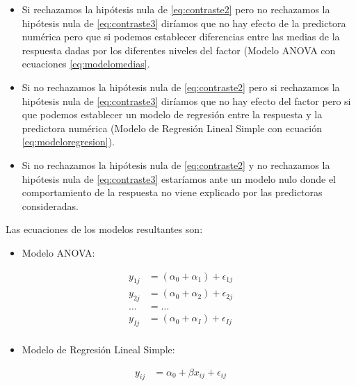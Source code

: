 \documentclass[
]{book}
\providecommand{\tightlist}{%
  \setlength{\itemsep}{0pt}\setlength{\parskip}{0pt}}
\theoremstyle{definition}
\theoremstyle{definition}
\theoremstyle{definition}
\theoremstyle{remark}
\begin{document}
\begin{itemize}
\tightlist
\item
  Si rechazamos la hipótesis nula de \eqref{eq:contraste2} pero no rechazamos la hipótesis nula de \eqref{eq:contraste3} diríamos que no hay efecto de la predictora numérica pero que si podemos establecer diferencias entre las medias de la respuesta dadas por los diferentes niveles del factor (Modelo ANOVA con ecuaciones \eqref{eq:modelomedias}.
\item
  Si no rechazamos la hipótesis nula de \eqref{eq:contraste2} pero si rechazamos la hipótesis nula de \eqref{eq:contraste3} diríamos que no hay efecto del factor pero si que podemos establecer un modelo de regresión entre la respuesta y la predictora numérica (Modelo de Regresión Lineal Simple con ecuación \eqref{eq:modeloregresion}).
\item
  Si no rechazamos la hipótesis nula de \eqref{eq:contraste2} y no rechazamos la hipótesis nula de \eqref{eq:contraste3} estaríamos ante un modelo nulo donde el comportamiento de la respuesta no viene explicado por las predictoras consideradas.
\end{itemize}

Las ecuaciones de los modelos resultantes son:

\begin{itemize}
\tightlist
\item
  Modelo ANOVA:
\end{itemize}

\begin{equation}
\begin{array}{ll}
y_{1j} &= (\alpha_0 + \alpha_1) + \epsilon_{1j}\\
y_{2j} &= (\alpha_0 + \alpha_2) + \epsilon_{2j}\\
\ldots &= \ldots \\
y_{Ij} &= (\alpha_0 + \alpha_I) + \epsilon_{Ij}\\
\end{array}
\label{eq:modelomedias}
\end{equation}

\begin{itemize}
\tightlist
\item
  Modelo de Regresión Lineal Simple:
\end{itemize}

\begin{equation}
\begin{array}{ll}
y_{ij} &= \alpha_0 + \beta  x_{ij} + \epsilon_{ij}\\
\end{array}
\label{eq:modeloregresion}
\end{equation}
\end{document}

